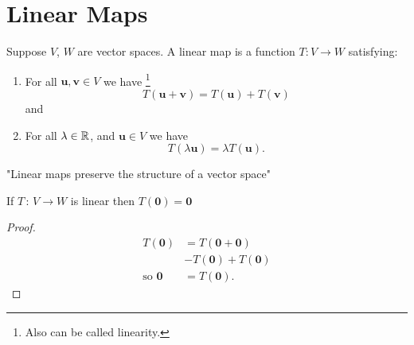 \documentclass[10pt, a4paper]{article}
\newcommand{\mbf}[1]{\mathbf{#1}}
\begin{document}
\section{Linear Maps}
\begin{definition}
    Suppose $V$,
    $W$ are vector spaces.
    A linear map is a function $T : V \rightarrow W$ satisfying:
    \begin{enumerate}[label = (\roman*)]
        \item For all $\mbf{u}, \mbf{v} \in V$ we have
        \footnote{Also can be called linearity.}
        \[
        T(\mbf{u} + \mbf{v}) = T(\mbf{u}) + T(\mbf{v})
        \]
        and
        \item For all $\lambda \in \mathbb{R}$,
        and $\mbf{u} \in V$ we have
        \[
        T(\lambda\mbf{u}) = \lambda T(\mbf{u}).
        \]
    \end{enumerate}
\end{definition}
"Linear maps preserve the structure of a vector space"

\begin{lemma}
    If $T\,:\, V \rightarrow W$ is linear then $T(\mbf{0}) = \mbf{0}$
    \begin{proof}
        \begin{align*}
            T(\mbf{0}) &= T(\mbf{0 + 0}) \\
            &- T(\mbf{0}) + T(\mbf{0}) \\
            \text{so } \mbf{0} &= T(\mbf{0}).
        \end{align*}
    \end{proof}
\end{lemma}
\end{document}
